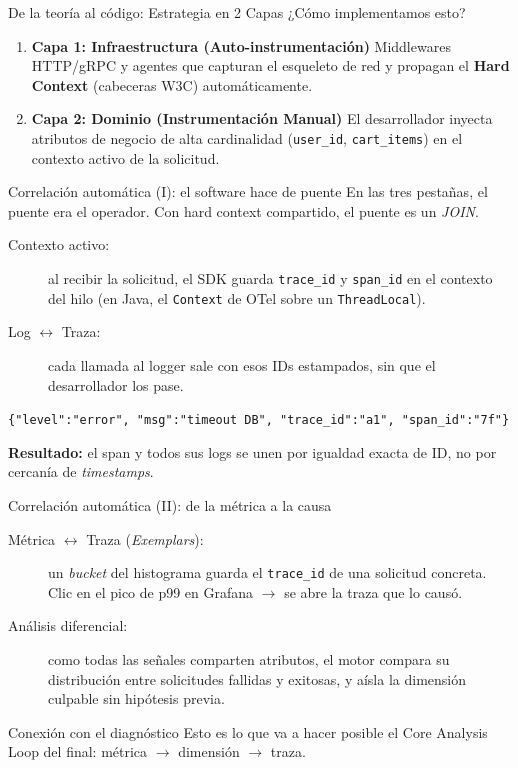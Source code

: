 \documentclass[institutional,screen,none]{../cls/ua-engineering-v6-beamer}
\begin{document}
\begin{frame}{De la teoría al código: Estrategia en 2 Capas}
¿Cómo implementamos esto?

\begin{enumerate}
\item \textbf{Capa 1: Infraestructura (Auto-instrumentación)}
Middlewares HTTP/gRPC y agentes que capturan el esqueleto de red y propagan el \textbf{Hard Context} (cabeceras W3C) automáticamente.
\pause
\item \textbf{Capa 2: Dominio (Instrumentación Manual)}
El desarrollador inyecta atributos de negocio de alta cardinalidad (\texttt{user\_id}, \texttt{cart\_items}) en el contexto activo de la solicitud.
\end{enumerate}
\end{frame}

\begin{frame}{Correlación automática (I): el software hace de puente}
En las tres pestañas, el puente era el operador. Con hard context compartido, el puente es un \emph{JOIN}.

\begin{description}
\item[Contexto activo:] al recibir la solicitud, el SDK guarda \texttt{trace\_id} y \texttt{span\_id} en el contexto del hilo (en Java, el \texttt{Context} de OTel sobre un \texttt{ThreadLocal}).
\pause
\item[Log $\leftrightarrow$ Traza:] cada llamada al logger sale con esos IDs estampados, sin que el desarrollador los pase.
\end{description}

\begin{center}
\scriptsize
\texttt{\{"level":"error", "msg":"timeout DB", \textcolor{UAIngOrange}{"trace\_id":"a1", "span\_id":"7f"}\}}
\end{center}

\pause

\textbf{Resultado:} el span y todos sus logs se unen por igualdad exacta de ID, no por cercanía de \emph{timestamps}.
\end{frame}

\begin{frame}{Correlación automática (II): de la métrica a la causa}
\begin{description}
\item[Métrica $\leftrightarrow$ Traza (\emph{Exemplars}):] un \emph{bucket} del histograma guarda el \texttt{trace\_id} de una solicitud concreta. Clic en el pico de p99 en Grafana $\rightarrow$ se abre la traza que lo causó.
\pause
\item[Análisis diferencial:] como todas las señales comparten atributos, el motor compara su distribución entre solicitudes fallidas y exitosas, y aísla la dimensión culpable sin hipótesis previa.
\end{description}

\pause

\begin{block}{Conexión con el diagnóstico}
Esto es lo que va a hacer posible el Core Analysis Loop del final: métrica $\rightarrow$ dimensión $\rightarrow$ traza.
\end{block}
\end{frame}
\end{document}

